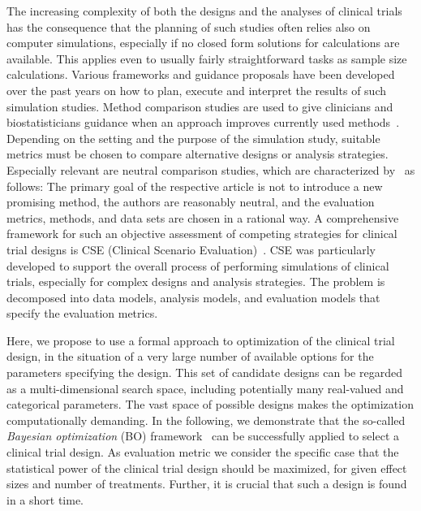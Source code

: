\documentclass[bimj,fleqn]{w-art}
\theoremstyle{plain}
\theoremstyle{definition}
\begin{document}
The increasing complexity of both the designs and the analyses of clinical trials has the consequence that the planning of such studies often relies also on computer simulations, especially if no closed form solutions for calculations are available.
This applies even to usually fairly straightforward tasks as sample size calculations. 
Various frameworks and guidance proposals have been developed over the past years on how to plan, execute and interpret the results of such simulation studies.
Method comparison studies are used to give clinicians and biostatisticians guidance when an approach improves currently used methods~\citep{hanneman_design_2008}.  
Depending on the setting and the purpose of the simulation study, suitable metrics must be chosen to compare alternative designs or analysis strategies. 
Especially relevant are neutral comparison studies, which are characterized by~\citet{boulesteix_plea_2013} as follows:
The primary goal of the respective article is not to introduce a new promising method, the authors are reasonably neutral, and the evaluation metrics, methods, and data sets are chosen in a rational way.
A comprehensive framework for such an objective assessment of competing strategies for clinical trial designs is CSE (Clinical Scenario Evaluation)~\citep{benda_aspects_2010,friede_refinement_2010}.
CSE was particularly developed to support the overall process of performing simulations of clinical trials, especially for complex designs and analysis strategies.
The problem is decomposed into data models, analysis models, and evaluation models that specify the evaluation metrics.

Here, we propose to use a formal approach to optimization of the clinical trial design, in the situation of a very large number of available options for the parameters specifying the design. 
This set of candidate designs can be regarded as a multi-dimensional search space, including potentially many real-valued and categorical parameters.
The vast space of possible designs makes the optimization computationally demanding.
In the following, we demonstrate that the so-called \emph{Bayesian optimization} (BO) framework~\citep{jones_taxonomy_2001} can be successfully applied to select a clinical trial design.
As evaluation metric we consider the specific case that the statistical power of the clinical trial design should be maximized, for given effect sizes and number of treatments.
Further, it is crucial that such a design is found in a short time.
\end{document}
